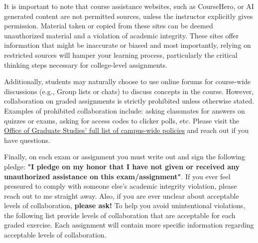 \documentclass[11pt,usenames,dvipsnames,svgnames,x11names,letterpaper]{article}
\newcommand{\urllink}[2]{\href{#1}{\textcolor{Tomato3}{{{\tiny\faChevronRight}\uline{#2}}}}}
\begin{document}
\vspace{0.3cm}

It is important to note that course assistance websites, such as CourseHero, or AI generated content are not
permitted sources, unless the instructor explicitly gives permission. Material taken or copied from these sites can
be deemed unauthorized material and a violation of academic integrity. These sites offer information that might be
inaccurate or biased and most importantly, relying on restricted sources will hamper your learning process,
particularly the critical thinking steps necessary for college-level assignments.

\vspace{0.3cm}

Additionally, students may naturally choose to use online forums for course-wide discussions (e.g., Group lists or
chats) to discuss concepts in the course. However, collaboration on graded assignments is strictly prohibited
unless otherwise stated. Examples of prohibited collaboration include: asking classmates for answers on quizzes or
exams, asking for access codes to clicker polls, etc. Please visit the \urllink{https://academiccatalog.umd.edu/graduate/policies/}{Office of Graduate Studies' full list of campus-wide policies} and reach out if you have questions.

\vspace{0.3cm}

Finally, on each exam or assignment you must write out and sign the following pledge: \textbf{"I pledge on my honor that I have not given or received any unauthorized assistance on this exam/assignment"}. If you ever feel pressured to comply with someone else's academic integrity violation, please reach out to me straight away. Also, if you are ever unclear about acceptable levels of collaboration, \textbf{please ask!} To help you avoid unintentional violations, the following list provide levels of collaboration that are acceptable for each graded exercise. Each assignment will contain more specific information regarding acceptable levels of collaboration.
\end{document}
